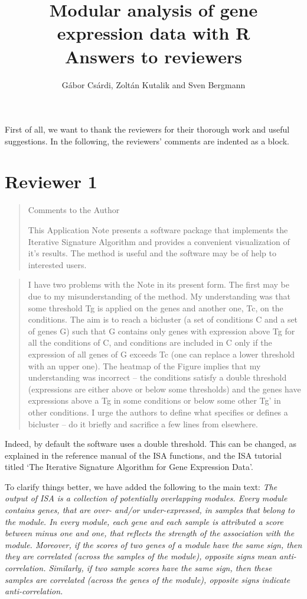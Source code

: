 \documentclass[a4paper]{article}
\title{Modular analysis of gene expression data with R\\
  Answers to reviewers}
\author{G\'abor Cs\'ardi, Zolt\'an Kutalik and Sven Bergmann}
\begin{document}
\maketitle

First of all, we want to thank the reviewers for their thorough work
and useful suggestions. In the following, the reviewers' comments are
indented as a block.

\section{Reviewer 1}

\begin{quote}
Comments to the Author

This Application Note presents a software package that implements the
Iterative Signature Algorithm and provides a convenient visualization
of it’s results. The method is useful and the software may be of help
to interested users. 
\end{quote}

\begin{quote}
I have two problems with the Note in its present form.
The first may be due to my misunderstanding of the method. My
understanding was that some threshold Tg is applied on the genes and
another one, Tc, on the conditions. The aim is to reach a bicluster (a
set of conditions C and a set of genes G) such that G contains only
genes with expression above Tg for all the conditions of C, and
conditions are included in C only if the expression of all genes of G
exceeds Tc (one can replace a lower threshold with an upper one). The
heatmap of the Figure implies that my understanding was incorrect –
the conditions satisfy a double threshold (expressions are either
above or below some thresholds) and the genes have expressions above a
Tg in some conditions or below some other Tg’ in other conditions. 
I urge the authors to define what specifies or defines a bicluster –
do it briefly and sacrifice a few lines from elsewhere. 
\end{quote}

Indeed, by default the software uses a double threshold. This can be
changed, as explained in the reference manual of the ISA functions,
and the ISA tutorial titled `The Iterative Signature Algorithm for
Gene Expression Data'.

To  clarify things better, we have added the following to the main
text:
\textsl{The output of ISA is a collection of potentially overlapping
modules. Every module contains genes, that are over- and/or
under-expressed, in samples that belong to the module.
In every module, each gene and each sample is attributed a
score between minus one and one, that reflects the strength of the
association with the module. Moreover, if the scores of two genes of a
module have the same sign, then they are correlated (across the
samples of the module), opposite signs mean
anti-correlation. Similarly, if two sample
scores have the same sign, then these samples are correlated (across
the genes of the module), opposite signs indicate anti-correlation.}
\end{document}
